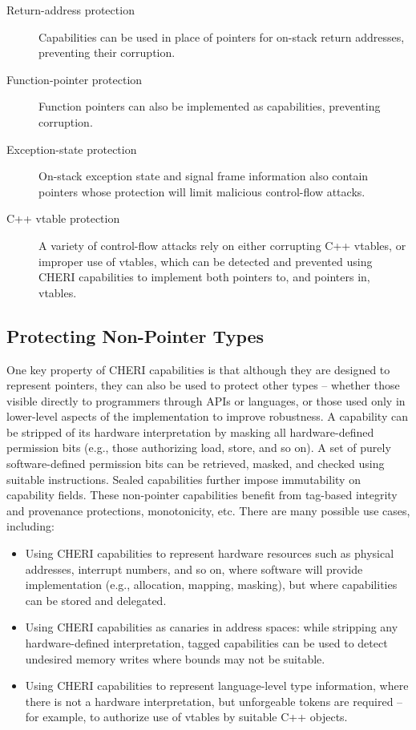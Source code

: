 \begin{description}
\item[Return-address protection] Capabilities can be used in place of pointers
  for on-stack return addresses, preventing their corruption.

\item[Function-pointer protection] Function pointers can also be implemented
  as capabilities, preventing corruption.

\item[Exception-state protection] On-stack exception state and signal
  frame information also contain pointers whose protection will limit
  malicious control-flow attacks.

\item[C++ vtable protection] A variety of control-flow attacks rely on either
  corrupting C++ vtables, or improper use of vtables, which can be detected
  and prevented using CHERI capabilities to implement both pointers to, and
  pointers in, vtables.
\end{description}

\subsection{Protecting Non-Pointer Types}

One key property of CHERI capabilities is that although they are designed to
represent pointers, they can also be used to protect other types -- whether
those visible directly to programmers through APIs or languages, or those used
only in lower-level aspects of the implementation to improve robustness.
A capability can be stripped of its hardware interpretation by masking all
hardware-defined permission bits (e.g., those authorizing load, store, and so
on).
A set of purely software-defined permission bits can be retrieved, masked, and
checked using suitable instructions.
Sealed capabilities further impose immutability on capability fields.
These non-pointer capabilities benefit from tag-based integrity and provenance
protections, monotonicity, etc.
There are many possible use cases, including:

\begin{itemize}
\item Using CHERI capabilities to represent hardware resources such as
  physical addresses, interrupt numbers, and so on, where software will
  provide implementation (e.g., allocation, mapping, masking), but 
where capabilities
  can be stored and delegated.

\item Using CHERI capabilities as canaries in address spaces: while stripping
  any hardware-defined interpretation, tagged capabilities can be used to
  detect undesired memory writes where bounds may not be suitable.

\item Using CHERI capabilities to represent language-level type information,
  where there is not a hardware interpretation, but unforgeable tokens are
  required -- for example, to authorize use of vtables by suitable C++
  objects.
\end{itemize}

